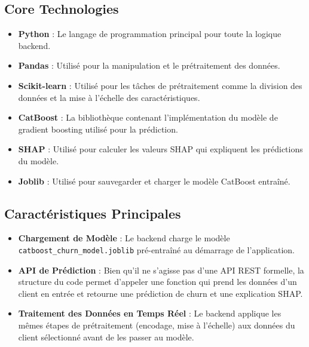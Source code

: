 \subsection{Core Technologies}
\begin{itemize}
    \item \textbf{Python} : Le langage de programmation principal pour toute la logique backend.
    \item \textbf{Pandas} : Utilisé pour la manipulation et le prétraitement des données.
    \item \textbf{Scikit-learn} : Utilisé pour les tâches de prétraitement comme la division des données et la mise à l'échelle des caractéristiques.
    \item \textbf{CatBoost} : La bibliothèque contenant l'implémentation du modèle de gradient boosting utilisé pour la prédiction.
    \item \textbf{SHAP} : Utilisé pour calculer les valeurs SHAP qui expliquent les prédictions du modèle.
    \item \textbf{Joblib} : Utilisé pour sauvegarder et charger le modèle CatBoost entraîné.
\end{itemize}

\subsection{Caractéristiques Principales}
\begin{itemize}
    \item \textbf{Chargement de Modèle} : Le backend charge le modèle \texttt{catboost\_churn\_model.joblib} pré-entraîné au démarrage de l'application.
    \item \textbf{API de Prédiction} : Bien qu'il ne s'agisse pas d'une API REST formelle, la structure du code permet d'appeler une fonction qui prend les données d'un client en entrée et retourne une prédiction de churn et une explication SHAP.
    \item \textbf{Traitement des Données en Temps Réel} : Le backend applique les mêmes étapes de prétraitement (encodage, mise à l'échelle) aux données du client sélectionné avant de les passer au modèle.
\end{itemize}
